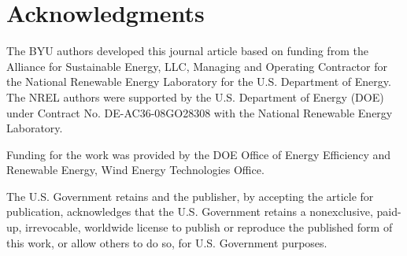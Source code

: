 \documentclass[conf]{new-aiaa}
\begin{document}
\section*{Acknowledgments}
The BYU authors developed this journal article based on funding from the Alliance for Sustainable Energy, LLC, Managing and Operating Contractor for the National Renewable Energy Laboratory for the U.S. Department of Energy.  The NREL authors were supported by the U.S. Department of Energy (DOE) under Contract No. DE-AC36-08GO28308 with the National Renewable Energy Laboratory.

Funding for the work was provided by the DOE Office of Energy Efficiency and Renewable Energy, Wind Energy Technologies Office.

The U.S. Government retains and the publisher, by accepting the article for publication, acknowledges that the U.S. Government retains a nonexclusive, paid-up, irrevocable, worldwide license to publish or reproduce the published form of this work, or allow others to do so, for U.S. Government purposes.



\end{document}
